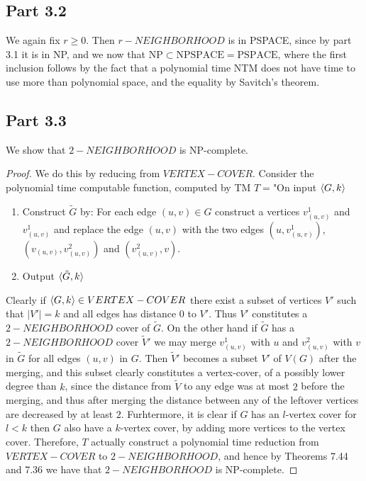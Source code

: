 \documentclass[a4paper,11pt]{article}
\newcommand{\abs}[1]{\left\lvert #1 \right\rvert}
\numberwithin{equation}{section}
\begin{document}
\subsection*{Part 3.2}
We again fix $ r\geq0 $. Then $ r-NEIGHBORHOOD $ is in PSPACE, since by part 3.1 it is in NP, and we now that $ \text{NP}\subset \text{NPSPACE}=\text{PSPACE} $, where the first inclusion follows by the fact that a polynomial time NTM does not have time to use more than polynomial space, and the equality by Savitch's theorem. 
\subsection*{Part 3.3}
We show that $ 2-NEIGHBORHOOD $ is NP-complete.\begin{proof}
	We do this by reducing from $ VERTEX-COVER $. Consider the polynomial time computable function, computed by TM $ T= $"On input $ \braket{G,k} $\begin{enumerate}
		\item Construct $ \tilde{G} $ by: For each edge $ (u,v)\in G $ construct a vertices $ v^1_{(u,v)} $ and $ v^1_{(u,v)} $ and replace the edge $ (u,v) $ with the two edges $ (u,v^1_{(u,v)}) $, $ (v_{(u,v)},v^2_{(u,v)}) $ and $ (v^2_{(u,v)},v) $.\\
		\item Output $ \braket{\tilde{G},k} $
	\end{enumerate}
	Clearly if $ \braket{G,k}\in VERTEX-COVER $ there exist a subset of vertices $ V' $ such that $ \abs{V'}=k $ and all edges has distance $ 0 $ to $ V' $. Thus $ V' $ constitutes a $ 2-NEIGHBORHOOD $ cover of $ \tilde{G} $. On the other hand if $ \tilde{G} $ has a $ 2-NEIGHBORHOOD $ cover $ \tilde{V}' $ we may merge $ v^1_{(u,v)} $ with $ u $ and $ v^2_{(u,v)} $ with $ v $ in $ \tilde{G} $ for all edges $ (u,v) $ in $ G $. Then $ \tilde{V}' $ becomes a subset $ V' $ of $ V(G) $ after the merging, and this subset clearly constitutes a vertex-cover, of a possibly lower degree than $ k $, since the distance from $ \tilde{V} $ to any edge was at most $ 2 $ before the merging, and thus after merging the distance between any of the leftover vertices are decreased by at least $ 2 $. Furhtermore, it is clear if $ G $ has an $ l $-vertex cover for $ l<k $ then $ G $ also have a $ k $-vertex cover, by adding more vertices to the vertex cover. Therefore, $ T $ actually construct a polynomial time reduction from $ VERTEX-COVER $ to $ 2-NEIGHBORHOOD $, and hence by Theorems 7.44 and 7.36 we have that $ 2-NEIGHBORHOOD $ is NP-complete.
\end{proof}
\end{document}
